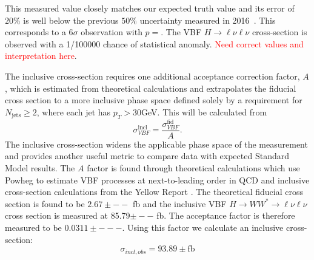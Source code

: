 This measured value closely matches our expected truth value and its error of $20\%$ is well below the previous $50\%$ uncertainty measured in 2016~\cite{Aaboud_2019}. This corresponds to a 6$\sigma$ observation with $p= $. The VBF $H\rightarrow\ell\nu\ell\nu$ cross-section is observed with a 1/100000 chance of statistical anomaly. \textcolor{red}{Need correct values and interpretation here}. 

The inclusive cross-section requires one additional acceptance correction factor, $A$, which is estimated from theoretical calculations and extrapolates the fiducial cross section to a more inclusive phase space defined solely by a requirement for $N_{\text{jets}}\geq2$, where each jet has $p_T>30$GeV. This will be calculated from
\begin{equation}
\sigma_{VBF}^{\text{incl}} = \frac{\sigma_{VBF}^{\text{fid}}}{A}.
\end{equation}
The inclusive cross-section widens the applicable phase space of the measurement and provides another useful metric to compare data with expected Standard Model results. The $A$ factor is found through theoretical calculations which use Powheg to estimate VBF processes at next-to-leading order in QCD and inclusive cross-section calculations from the Yellow Report \cite{YellowReport}. The theoretical fiducial cross section is found to be $2.67\pm--$ fb and the inclusive VBF $H\rightarrow WW^*\rightarrow \ell\nu\ell\nu$ cross section is measured at 85.79$\pm --$ fb. The acceptance factor is therefore measured to be $0.0311 \pm ---$. Using this factor we calculate an inclusive cross-section:
\begin{equation}
\sigma_{incl,obs} = 93.89 \pm \text{fb}
\end{equation} 

